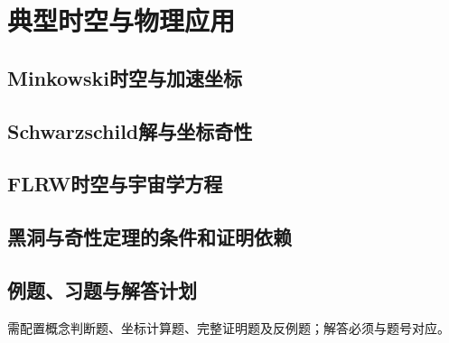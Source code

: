 \chapter{典型时空与物理应用}
\label{ch:23-spacetimes}

\section{Minkowski时空与加速坐标}
\PlannedSection

\section{Schwarzschild解与坐标奇性}
\PlannedSection

\section{FLRW时空与宇宙学方程}
\PlannedSection

\section{黑洞与奇性定理的条件和证明依赖}
\PlannedSection

\section{例题、习题与解答计划}
需配置概念判断题、坐标计算题、完整证明题及反例题；解答必须与题号对应。
